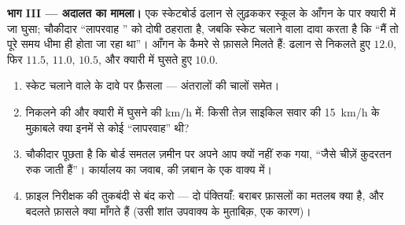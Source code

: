 \begin{problem}
\medskip\noindent\textbf{भाग III --- अदालत का मामला।}
एक स्केटबोर्ड ढलान से लुढ़ककर स्कूल के आँगन के पार क्यारी में जा घुसा;
चौकीदार ``लापरवाह '' को दोषी ठहराता है, जबकि स्केट चलाने वाला दावा
करता है कि ``मैं तो पूरे समय धीमा ही होता जा रहा था''। आँगन के कैमरे से
फ़ासले मिलते हैं: ढलान से निकलते हुए $12.0$, फिर $11.5$, $11.0$,
$10.5$, और क्यारी में घुसते हुए $10.0$.
\begin{enumerate}[resume]
  \item स्केट चलाने वाले के दावे पर फ़ैसला --- अंतरालों की चालों समेत।
  \item निकलने की  और क्यारी में घुसने की  \unit{km/h} में: किसी
        तेज़ साइकिल सवार की \qty{15}{km/h} के मुक़ाबले क्या इनमें से
        कोई ``लापरवाह'' थी?
  \item चौकीदार पूछता है कि बोर्ड समतल ज़मीन पर अपने आप क्यों नहीं रुक
        गया, ``जैसे चीज़ें क़ुदरतन रुक जाती हैं''। कार्यालय का जवाब,
         की ज़बान के एक वाक्य में।
  \item फ़ाइल निरीक्षक की तुकबंदी से बंद करो --- दो पंक्तियाँ: बराबर
        फ़ासलों का मतलब क्या है, और बदलते फ़ासले क्या माँगते हैं (उसी
        शांत उपवाक्य के मुताबिक़, एक कारण)।
\end{enumerate}
\end{problem}
